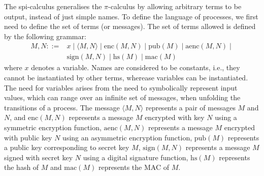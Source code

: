 \documentclass{article}
\begin{document}
The spi-calculus generalises the $\pi$-calculus by allowing arbitrary terms to be output,
instead of just simple names. To define the language of processes, we first need to define
the set of terms (or messages). The set of terms allowed is defined by the following grammar:
$$
\begin{array}{ll}
M, N  ::= & x \mid \langle M, N \rangle \mid \mathrm{enc}(M, N) \mid \mathrm{pub}(M) \mid \mathrm{aenc}(M, N) \mid \\
	  & \mathrm {sign}(M, N) \mid \mathrm{hs}(M) \mid \mathrm{mac}(M)
\end{array}
$$
where $x$ denotes a variable. Names are considered to be constants,
i.e., they cannot be instantiated by other terms, wherease variables can be instantiated.
The need for variables arises from the need to symbolically represent input values, which
can range over an infinite set of messages, when 
unfolding the transitions of a process. The message $\langle M, N \rangle$ represents
a pair of messages $M$ and $N$, and $\mathrm{enc}(M,N)$ represents a message $M$ encrypted
with key $N$ using a symmetric encryption function, $\mathrm{aenc}(M, N)$ represents a message $M$ encrypted with public key $N$
using an asymmetric encryption function, $\mathrm{pub}(M)$ represents a public key corresponding
to secret key $M$, $\mathrm{sign}(M, N)$ represents a message $M$ signed with secret key $N$ using
a digital signature function, $\mathrm{hs}(M)$ represents the hash of $M$ and $\mathrm{mac}(M)$ represents the
MAC of $M$.
\end{document}
